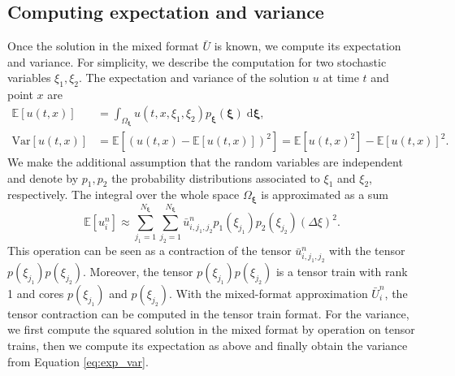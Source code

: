 \documentclass{article}
\newcommand{\bfxi}{ {\bm \xi} }
\newcommand{\E}{ \mathbb E }
\newcommand{\diff}{ \; \text{d} }
\newcommand{\var}{ \text{Var} }
\begin{document}
\subsection{Computing expectation and variance} \label{sec:Exp_var}
Once the solution in the mixed format $\bar U$ is known, we compute its expectation and variance. 
For simplicity, we describe the computation for two stochastic variables $\xi_1, \xi_2$. 
The expectation and variance of the solution $u$ at time $t$ and point $x$ are 
\begin{align} \label{eq:exp_var}
    \E[u(t,x)] &= \int_{\Omega_\bfxi} u(t,x,\xi_1,\xi_2) p_\bfxi (\bfxi) \diff \bfxi, 
    \\
    \var [u(t,x)] &= \E[(u(t,x)-\E[u(t,x)])^2] = \E[u(t,x)^2] - \E[u(t,x)]^2.  
\end{align}
We make the additional assumption that the random variables are independent and denote by $p_1, p_2$ the probability distributions associated to $\xi_1$ and $\xi_2$, respectively. 
The integral over the whole space $\Omega_\bfxi$ is approximated as a sum 
\begin{equation}
    \E[u_i^n] \approx \sum_{j_1=1}^{N_\bfxi} \sum_{j_2=1}^{N_\bfxi} 
    \bar u_{i,j_1,j_2}^n p_1(\xi_{j_1}) p_2(\xi_{j_2}) (\Delta \xi)^2.
\end{equation}
This operation can be seen as a contraction of the tensor 
$\bar u_{i,j_1,j_2}^n$ with the tensor $p(\xi_{j_1})p(\xi_{j_2})$. 
Moreover, the tensor $p(\xi_{j_1})p(\xi_{j_2})$ is a tensor train with rank 1 and cores $p(\xi_{j_1})$ and $p(\xi_{j_2})$. 
With the mixed-format approximation $\bar U_i^n$, the tensor contraction can be computed in the tensor train format.
For the variance, we first compute the squared solution in the mixed format by operation on tensor trains, then we compute its expectation as above and finally obtain the variance from Equation \eqref{eq:exp_var}. 
\end{document}
